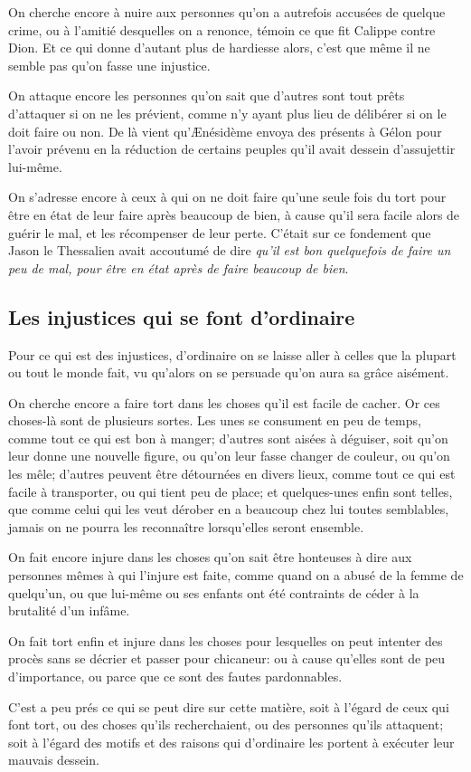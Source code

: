 On cherche encore à nuire aux personnes qu'on a autrefois accusées de quelque crime, ou à l’amitié desquelles
on a renonce, témoin ce que fit Calippe contre Dion. Et ce qui donne d'autant plus de hardiesse alors, c'est
que même il ne semble pas qu'on fasse une injustice.

On attaque encore les personnes qu'on sait que d'autres sont tout prêts d'attaquer si on ne les prévient, comme n'y
ayant plus lieu de délibérer si on le doit faire ou non. De là vient qu'Ænésidème envoya des présents à Gélon pour
l'avoir prévenu en la réduction de certains peuples qu'il avait dessein d'assujettir lui-même.

On s'adresse encore à ceux à qui on ne doit faire qu'une seule fois du tort pour être en état de leur faire après
beaucoup de bien, à cause qu'il sera facile alors de guérir le mal, et les récompenser de leur perte. C'était sur
ce fondement que Jason le Thessalien avait accoutumé de dire \emph{qu'il est bon quelquefois de faire un peu de mal,
pour être en état après de faire beaucoup de bien}.

\subsection{Les injustices qui se font d'ordinaire}

Pour ce qui est des injustices, d'ordinaire on se laisse aller à celles que la plupart ou tout le monde fait, vu
qu'alors on se persuade qu'on aura sa grâce aisément.

On cherche encore a faire tort dans les choses qu'il est facile de cacher. Or ces choses-là sont de plusieurs sortes.
Les unes se consument en peu de temps, comme tout ce qui est bon à manger; d'autres sont aisées à déguiser, soit
qu'on leur donne une nouvelle figure, ou qu'on leur fasse changer de couleur, ou qu'on les mêle; d'autres peuvent
être détournées en divers lieux, comme tout ce qui est facile à transporter, ou qui tient peu de place; et quelques-unes
enfin sont telles, que comme celui qui les veut dérober en a beaucoup chez lui toutes semblables, jamais on ne
pourra les reconnaître lorsqu'elles seront ensemble. 

On fait encore injure dans les choses qu'on sait être honteuses à dire aux personnes mêmes à qui l'injure est faite,
comme quand on a abusé de la femme de quelqu'un, ou que lui-même ou ses enfants ont été contraints de céder à la
brutalité d'un infâme. 

On fait tort enfin et injure dans les choses pour lesquelles on peut intenter des procès sans se décrier et passer
pour chicaneur: ou à cause qu'elles sont de peu d'importance, ou parce que ce sont des fautes pardonnables. 

C'est a peu prés ce qui se peut dire sur cette matière, soit à l'égard de ceux qui font tort, ou des choses qu'ils
recherchaient, ou des personnes qu'ils attaquent; soit à l'égard des motifs et des raisons qui d'ordinaire les portent
à exécuter leur mauvais dessein.
